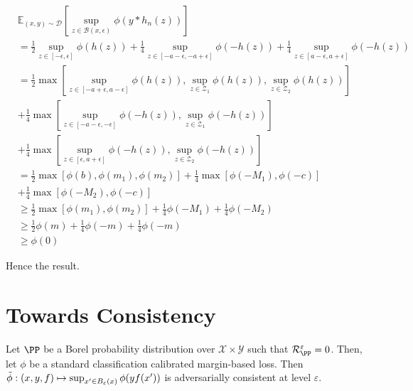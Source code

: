 \begin{prv*}
\begin{align*}
    &\mathbb{E}_{(x,y)\sim \mathcal{D}}\left[ \sup\limits_{z \in \mathcal{B}(x,\epsilon)} \phi(y*h_n(z))\right] \\
    &= \frac{1}{2} \sup\limits_{ z \in \left[ -\epsilon, \epsilon \right]} \phi(h(z))
            + \frac{1}{4}\sup\limits_{z \in \left[ -a-\epsilon, -a+\epsilon \right]} \phi(-h(z)) 
            + \frac{1}{4}\sup\limits_{z \in \left[ a-\epsilon, a+\epsilon \right]} \phi(-h(z)) \\
    &= \frac{1}{2} \max \left[ \sup\limits_{ z \in \left[ -a+\epsilon, a-\epsilon \right]} \phi(h(z)), \sup\limits_{ z \in \mathcal{Z}_1} \phi(h(z)), \sup\limits_{ z \in \mathcal{Z}_2} \phi(h(z)) \right] \\
    &+ \frac{1}{4} \max \left[ \sup\limits_{ z \in \left[ -a-\epsilon, -\epsilon \right]} \phi(-h(z)), \sup\limits_{ z \in \mathcal{Z}_1} \phi(-h(z)) \right] \\
    &+ \frac{1}{4} \max \left[ \sup\limits_{ z \in \left[ \epsilon, a+\epsilon \right]} \phi(-h(z)), \sup\limits_{ z \in \mathcal{Z}_2} \phi(-h(z)) \right] \\
    &= \frac{1}{2} \max \left[ \phi(b), \phi(m_1), \phi(m_2) \right]
    + \frac{1}{4} \max \left[ \phi(-M_1), \phi(-c) \right] \\
    &+ \frac{1}{4} \max \left[ \phi(-M_2), \phi(-c) \right] \\
    &\geq \frac{1}{2} \max \left[\phi(m_1), \phi(m_2) \right] + \frac{1}{4}\phi(-M_1) + \frac{1}{4}\phi(-M_2) \\
    &\geq \frac{1}{2} \phi(m) + \frac{1}{4}\phi(-m) + \frac{1}{4}\phi(-m) \\
    &\geq \phi(0)
\end{align*}

Hence the result.
\end{prv*}




\section{Towards Consistency}

\begin{prop}
Let $\PP$ be a Borel probability distribution over $\mathcal{X}\times\mathcal{Y}$ such that $\mathcal{R}^{\varepsilon}_\PP = 0$. Then, let $\phi$ be a standard classification calibrated margin-based loss. Then $\Tilde{\phi}:(x,y,f)\mapsto\sup_{x'\in B_\varepsilon(x)}\phi(yf(x'))$ is adversarially consistent at level $\varepsilon$.
\end{prop}



